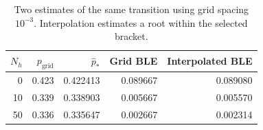 \begin{table}[htbp]
\centering\small
\begin{tabular}{rrrrr}
\toprule
$N_h$ & $p_{\mathrm{grid}}$ & $\widehat p_\ast$ & Grid BLE & Interpolated BLE \\
\midrule
0 & 0.423 & 0.422413 & 0.089667 & 0.089080 \\
10 & 0.339 & 0.338903 & 0.005667 & 0.005570 \\
50 & 0.336 & 0.335647 & 0.002667 & 0.002314 \\
\bottomrule
\end{tabular}
\caption{Two estimates of the same transition using grid spacing $10^{-3}$. Interpolation estimates a root within the selected bracket.}
\label{tab:ble-resolution}
\end{table}
